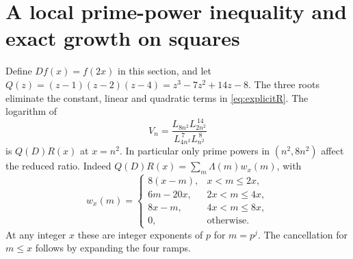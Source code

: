 \documentclass[11pt,a4paper]{article}
\begin{document}
\section{A local prime-power inequality and exact growth on squares}\label{sec:local}
Define $D f(x)=f(2x)$ in this section, and let $Q(z)=(z-1)(z-2)(z-4)=z^3-7z^2+14z-8$. The three roots eliminate the constant, linear and quadratic terms in \eqref{eq:explicitR}. The logarithm of
\begin{equation}\label{eq:ratio}
 V_n=\frac{L_{8n^2} L_{2n^2}^{\,14}}{L_{4n^2}^{\,7}L_{n^2}^{\,8}}
\end{equation}
is $Q(D)R(x)$ at $x=n^2$. In particular only prime powers in $(n^2,8n^2)$ affect the reduced ratio. Indeed $Q(D)R(x)=\sum_m\Lambda(m)w_x(m)$, with
\begin{equation}\label{eq:weights}
 w_x(m)=
 \begin{cases}
  8(x-m),&x<m\le2x,\\
  6m-20x,&2x<m\le4x,\\
  8x-m,&4x<m\le8x,\\
  0,&\text{otherwise}.
 \end{cases}
\end{equation}
At any integer $x$ these are integer exponents of $p$ for $m=p^j$. The cancellation for $m\le x$ follows by expanding the four ramps.
\end{document}

